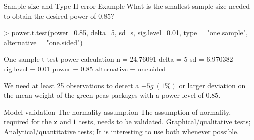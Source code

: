 \documentclass[t]{beamer}
\begin{document}

\begin{ftstf}
{Sample size and Type-II error}
{Example}
What is the smallest sample size needed to obtain the desired power of $0.85$?
\vhalf
\begin{rcode}
> power.t.test(power=0.85, delta=5, sd=s, sig.level=0.01,
               type = "one.sample", alternative = "one.sided")

One-sample t test power calculation 
n = 24.76091
delta = 5
sd = 6.970382
sig.level = 0.01
power = 0.85
alternative = one.sided
\end{rcode}
\vhalf
We need at least 25 observations to detect a $-5g\ (1\%)$ or larger deviation on the mean weight of the green peas packages with a power level of $0.85$.
\end{ftstf}

\begin{ftst}
{Model validation}
{The normality assumption}
The assumption of normality, required for the \textbf{z} and \textbf{t} tests, needs to be validated.
\vhalf
\bitems Graphical/qualitative tests;
	\spitem Analytical/quantitative tests; 
\eitem
\vhalf
It is interesting to use both whenever possible.
\end{ftst}

\end{document}
